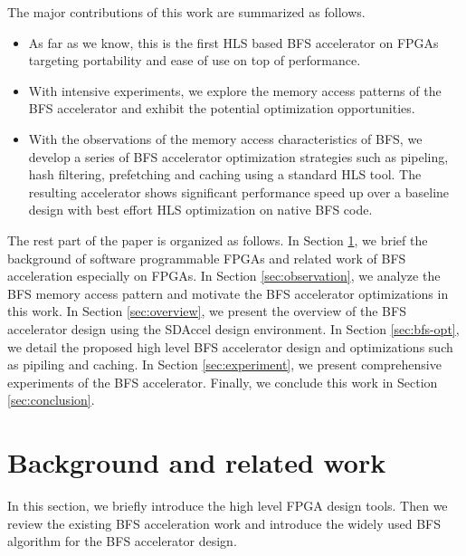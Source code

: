 The major contributions of this work are summarized as follows.
\begin{itemize}
    \item As far as we know, this is the first HLS based BFS accelerator on 
        FPGAs targeting portability and ease of use on top of performance. 
    \item With intensive experiments, we explore the memory access 
        patterns of the BFS accelerator and exhibit the potential 
        optimization opportunities.
    \item With the observations of the memory access characteristics of BFS, we 
        develop a series of BFS accelerator optimization strategies such 
        as pipeling, hash filtering, prefetching and caching using a standard HLS tool.
        The resulting accelerator shows significant performance speed up 
        over a baseline design with best effort HLS optimization on native BFS code.
\end{itemize}

The rest part of the paper is organized as follows. In Section \ref{sec:relatedwork}, 
we brief the background of software programmable FPGAs and related work of 
BFS acceleration especially on FPGAs. In Section \ref{sec:observation},  
we analyze the BFS memory access pattern and motivate the BFS accelerator 
optimizations in this work. In Section \ref{sec:overview}, we present 
the overview of the BFS accelerator design using the SDAccel design environment. 
In Section \ref{sec:bfs-opt}, we detail the proposed high level BFS accelerator 
design and optimizations such as pipiling and caching. 
In Section \ref{sec:experiment}, we present comprehensive experiments of the 
BFS accelerator. Finally, we conclude this work in Section \ref{sec:conclusion}.

\section{Background and related work} \label{sec:relatedwork}
In this section, we briefly introduce the high level FPGA design tools.
Then we review the existing BFS acceleration work and introduce the widely 
used BFS algorithm for the BFS accelerator design.

